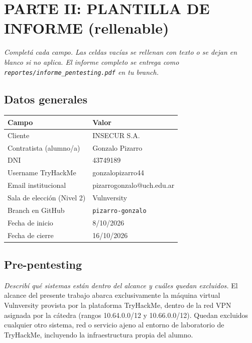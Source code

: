 \documentclass[11pt,a4paper]{article}
\begin{document}
\section{PARTE II: PLANTILLA DE INFORME (rellenable)}

\textit{Completá cada campo. Las celdas vacías se rellenan con texto o se dejan en blanco si no aplica. El informe completo se entrega como \texttt{reportes/informe\_pentesting.pdf} en tu branch.}

\subsection{Datos generales}

\begin{center}
\renewcommand{\arraystretch}{1.6}
\begin{tabularx}{\textwidth}{@{} p{5cm} X @{}}
\toprule
\textbf{Campo} & \textbf{Valor} \\
\midrule
Cliente & INSECUR S.A. \\
Contratista (alumno/a) & Gonzalo Pizarro\\
DNI & 43749189\\
Username TryHackMe & gonzalopizarro44\\
Email institucional & pizarrogonzalo@uch.edu.ar\\
Sala de elección (Nivel 2) & Vulnversity\\
Branch en GitHub & \texttt{pizarro-gonzalo} \\
Fecha de inicio & 8/10/2026 \\
Fecha de cierre & 16/10/2026 \\
\bottomrule
\end{tabularx}
\end{center}

\subsection{Pre-pentesting}\label{sec:pre}

\begin{campo}
\textit{Describí qué sistemas están dentro del alcance y cuáles quedan excluidos.}
El alcance del presente trabajo abarca exclusivamente la máquina virtual Vulnversity provista por la plataforma TryHackMe, dentro de la red VPN asignada por la cátedra (rangos 10.64.0.0/12 y 10.66.0.0/12). Quedan excluidos cualquier otro sistema, red o servicio ajeno al entorno de laboratorio de TryHackMe, incluyendo la infraestructura propia del alumno.\\\vspace{0.5cm}
\end{campo}
\end{document}
